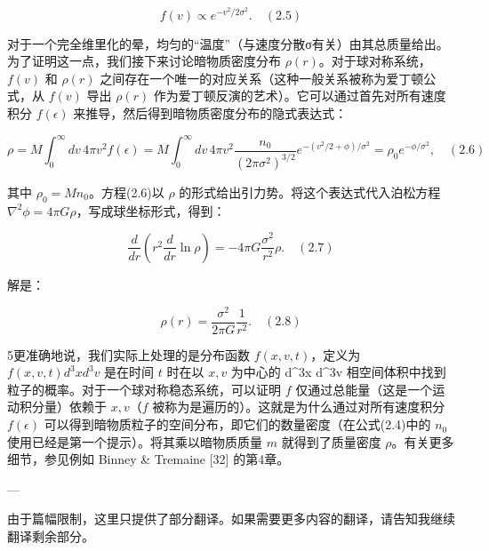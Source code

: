 \[ f(v) \propto e^{-v^2/2\sigma^2}. \quad (2.5) \]

对于一个完全维里化的晕，均匀的“温度”（与速度分散σ有关）由其总质量给出。为了证明这一点，我们接下来讨论暗物质密度分布 \(\rho(r)\)。对于球对称系统，\(f(v)\) 和 \(\rho(r)\) 之间存在一个唯一的对应关系（这种一般关系被称为爱丁顿公式，从 \(f(v)\) 导出 \(\rho(r)\) 作为爱丁顿反演的艺术）。它可以通过首先对所有速度积分 \(f(\epsilon)\) 来推导，然后得到暗物质密度分布的隐式表达式：

\[ \rho = M \int_0^\infty dv \, 4\pi v^2 f(\epsilon) = M \int_0^\infty dv \, 4\pi v^2 \frac{n_0}{(2\pi\sigma^2)^{3/2}} e^{-(v^2/2+\phi)/\sigma^2} = \rho_0 e^{-\phi/\sigma^2}, \quad (2.6) \]

其中 \(\rho_0 = Mn_0\)。方程(2.6)以 \(\rho\) 的形式给出引力势。将这个表达式代入泊松方程 \(\nabla^2\phi = 4\pi G\rho\)，写成球坐标形式，得到：

\[ \frac{d}{dr} \left( r^2 \frac{d}{dr} \ln\rho \right) = -4\pi G \frac{\sigma^2}{r^2} \rho. \quad (2.7) \]

解是：

\[ \rho(r) = \frac{\sigma^2}{2\pi G} \frac{1}{r^2}. \quad (2.8) \]

5更准确地说，我们实际上处理的是分布函数 \(f(x, v, t)\)，定义为 \(f(x, v, t) d^3x d^3v\) 是在时间 \(t\) 时在以 \(x, v\) 为中心的 d^3x d^3v 相空间体积中找到粒子的概率。对于一个球对称稳态系统，可以证明 \(f\) 仅通过总能量（这是一个运动积分量）依赖于 \(x, v\)（\(f\) 被称为是遍历的）。这就是为什么通过对所有速度积分 \(f(\epsilon)\) 可以得到暗物质粒子的空间分布，即它们的数量密度（在公式(2.4)中的 \(n_0\) 使用已经是第一个提示）。将其乘以暗物质质量 \(m\) 就得到了质量密度 \(\rho\)。有关更多细节，参见例如 Binney & Tremaine [32] 的第4章。

---

由于篇幅限制，这里只提供了部分翻译。如果需要更多内容的翻译，请告知我继续翻译剩余部分。 



